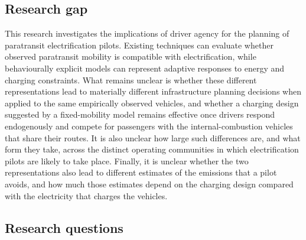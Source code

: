 \documentclass{elsarticle}
\begin{document}
\subsection{Research gap}
This research investigates the implications of driver agency for the planning of paratransit electrification pilots. Existing techniques can evaluate whether observed paratransit mobility is compatible with electrification, while behaviourally explicit models can represent adaptive responses to energy and charging constraints. What remains unclear is whether these different representations lead to materially different infrastructure planning decisions when applied to the same empirically observed vehicles, and whether a charging design suggested by a fixed-mobility model remains effective once drivers respond endogenously and compete for passengers with the internal-combustion vehicles that share their routes. It is also unclear how large such differences are, and what form they take, across the distinct operating communities in which electrification pilots are likely to take place. Finally, it is unclear whether the two representations also lead to different estimates of the emissions that a pilot avoids, and how much those estimates depend on the charging design compared with the electricity that charges the vehicles.

\subsection{Research questions}
\label{sec:research_questions}
\end{document}

